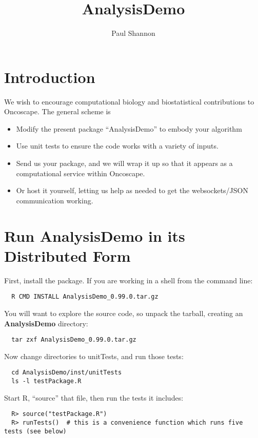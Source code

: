 \documentclass{article}
\title{AnalysisDemo}
\author{Paul Shannon}
\begin{document}
 

\maketitle

\section{Introduction}

We wish to encourage computational biology and biostatistical contributions to Oncoscape.  The general
scheme is

\begin{itemize}
    \item Modify the present package ``AnalysisDemo'' to embody your algorithm
    \item Use unit tests to ensure the code works with a variety of inputs.
    \item Send us your package, and we will wrap it up so that it appears as a computational service within Oncoscape.
    \item Or host it yourself, letting us help as needed to get the websockets/JSON communication working.
\end{itemize}

\section{Run AnalysisDemo in its Distributed Form}

First, install the package.  If you are working in a shell from the command line:

\begin{verbatim}
  R CMD INSTALL AnalysisDemo_0.99.0.tar.gz
\end{verbatim}

You will want to explore the source code, so unpack the tarball, creating an \textbf{AnalysisDemo} directory:
\begin{verbatim}
  tar zxf AnalysisDemo_0.99.0.tar.gz
\end{verbatim}

Now change directories to unitTests, and run those tests:
\begin{verbatim}
  cd AnalysisDemo/inst/unitTests
  ls -l testPackage.R
\end{verbatim}

Start R, ``source'' that file, then run the tests it includes:

\begin{verbatim}
  R> source("testPackage.R")
  R> runTests()  # this is a convenience function which runs five tests (see below)
\end{verbatim}
\end{document}
